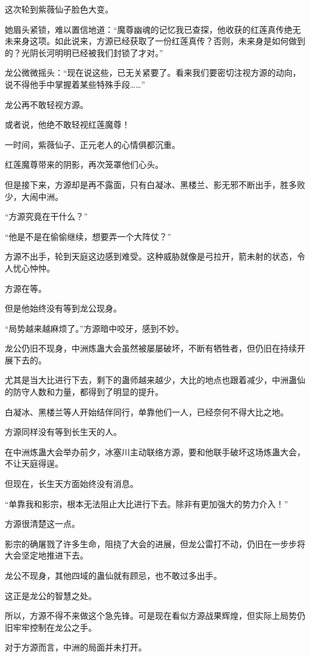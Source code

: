 \begin{this_body}
这次轮到紫薇仙子脸色大变。

她眉头紧锁，难以置信地道：“魔尊幽魂的记忆我已查探，他收获的红莲真传绝无未来身这项。如此说来，方源已经获取了一份红莲真传？否则，未来身是如何做到的？光阴长河明明已经被我们封锁了才对。”

龙公微微摇头：“现在说这些，已无关紧要了。看来我们要密切注视方源的动向，说不得他手中掌握着某些特殊手段……”

龙公再不敢轻视方源。

或者说，他绝不敢轻视红莲魔尊！

一时间，紫薇仙子、正元老人的心情俱都沉重。

红莲魔尊带来的阴影，再次笼罩他们心头。

但是接下来，方源却是再不露面，只有白凝冰、黑楼兰、影无邪不断出手，胜多败少，大闹中洲。

“方源究竟在干什么？”

“他是不是在偷偷继续，想要弄一个大阵仗？”

方源不出手，轮到天庭这边感到难受。这种威胁就像是弓拉开，箭未射的状态，令人忧心忡忡。

方源在等。

但是他始终没有等到龙公现身。

“局势越来越麻烦了。”方源暗中咬牙，感到不妙。

龙公仍旧不现身，中洲炼蛊大会虽然被屡屡破坏，不断有牺牲者，但仍旧在持续开展下去的。

尤其是当大比进行下去，剩下的蛊师越来越少，大比的地点也跟着减少，中洲蛊仙的防守人数和力量，都得到了明显的提升。

白凝冰、黑楼兰等人开始结伴同行，单靠他们一人，已经奈何不得大比之地。

方源同样没有等到长生天的人。

在中洲炼蛊大会举办前夕，冰塞川主动联络方源，要和他联手破坏这场炼蛊大会，不让天庭得逞。

但现在，长生天方面始终没有消息。

“单靠我和影宗，根本无法阻止大比进行下去。除非有更加强大的势力介入！”

方源很清楚这一点。

影宗的确屠戮了许多生命，阻挠了大会的进展，但龙公雷打不动，仍旧在一步步将大会坚定地推进下去。

龙公不现身，其他四域的蛊仙就有顾忌，也不敢过多出手。

这正是龙公的智慧之处。

所以，方源不得不来做这个急先锋。可是现在看似方源战果辉煌，但实际上局势仍旧牢牢控制在龙公之手。

对于方源而言，中洲的局面并未打开。


\end{this_body}
